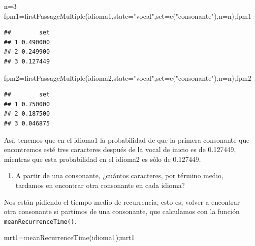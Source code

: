 \documentclass[
]{book}
\newenvironment{Shaded}{\begin{snugshade}}{\end{snugshade}}
\newcommand{\AttributeTok}[1]{\textcolor[rgb]{0.77,0.63,0.00}{#1}}
\newcommand{\DecValTok}[1]{\textcolor[rgb]{0.00,0.00,0.81}{#1}}
\newcommand{\FunctionTok}[1]{\textcolor[rgb]{0.00,0.00,0.00}{#1}}
\newcommand{\NormalTok}[1]{#1}
\newcommand{\OtherTok}[1]{\textcolor[rgb]{0.56,0.35,0.01}{#1}}
\newcommand{\StringTok}[1]{\textcolor[rgb]{0.31,0.60,0.02}{#1}}
\providecommand{\tightlist}{%
  \setlength{\itemsep}{0pt}\setlength{\parskip}{0pt}}
\theoremstyle{definition}
\theoremstyle{definition}
\theoremstyle{definition}
\theoremstyle{definition}
\theoremstyle{remark}
\begin{document}
\begin{Shaded}
\begin{Highlighting}[]
\NormalTok{n}\OtherTok{=}\DecValTok{3}
\NormalTok{fpm1}\OtherTok{=}\FunctionTok{firstPassageMultiple}\NormalTok{(idioma1,}\AttributeTok{state=}\StringTok{"vocal"}\NormalTok{,}\AttributeTok{set=}\FunctionTok{c}\NormalTok{(}\StringTok{"consonante"}\NormalTok{),}\AttributeTok{n=}\NormalTok{n);fpm1}
\end{Highlighting}
\end{Shaded}

\begin{verbatim}
##        set
## 1 0.490000
## 2 0.249900
## 3 0.127449
\end{verbatim}

\begin{Shaded}
\begin{Highlighting}[]
\NormalTok{fpm2}\OtherTok{=}\FunctionTok{firstPassageMultiple}\NormalTok{(idioma2,}\AttributeTok{state=}\StringTok{"vocal"}\NormalTok{,}\AttributeTok{set=}\FunctionTok{c}\NormalTok{(}\StringTok{"consonante"}\NormalTok{),}\AttributeTok{n=}\NormalTok{n);fpm2}
\end{Highlighting}
\end{Shaded}

\begin{verbatim}
##        set
## 1 0.750000
## 2 0.187500
## 3 0.046875
\end{verbatim}

Así, tenemos que en el idioma1 la probabilidad de que la primera consonante que encontremos esté tres caracteres después de la vocal de inicio es de 0.127449, mientras que esta probabilidad en el idioma2 es sólo de 0.127449.

\begin{enumerate}
\def\labelenumi{\arabic{enumi}.}
\setcounter{enumi}{5}
\tightlist
\item
  A partir de una consonante, ¿cuántos caracteres, por término medio, tardamos en encontrar otra consonante en cada idioma?
\end{enumerate}

Nos están pidiendo el tiempo medio de recurrencia, esto es, volver a encontrar otra consonante si partimos de una consonante, que calculamos con la función \texttt{meanRecurrenceTime()}.

\begin{Shaded}
\begin{Highlighting}[]
\NormalTok{mrt1}\OtherTok{=}\FunctionTok{meanRecurrenceTime}\NormalTok{(idioma1);mrt1}
\end{Highlighting}
\end{Shaded}
\end{document}
